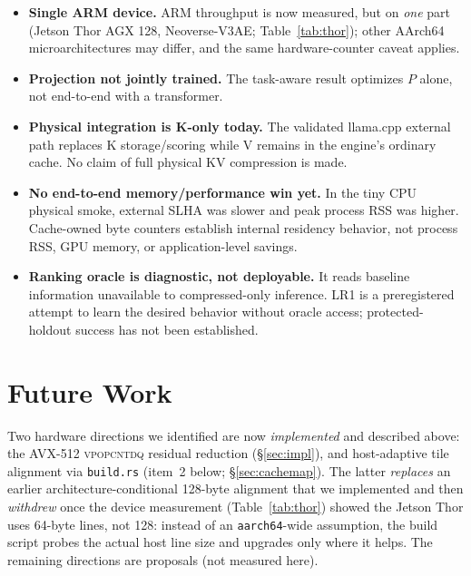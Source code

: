 \documentclass[11pt]{article}
\newcommand{\added}[1]{\textcolor{revisionblue}{#1}}
\theoremstyle{plain}
\theoremstyle{definition}
\begin{document}
\begin{itemize}[leftmargin=1.4em,itemsep=2pt]
    stays analytic for that reason.
  \item \textbf{Single ARM device.} ARM throughput is now measured, but on
    \emph{one} part (Jetson Thor AGX 128, Neoverse-V3AE; Table~\ref{tab:thor});
    other AArch64 microarchitectures may differ, and the same
    hardware-counter caveat applies.
  \item \textbf{Projection not jointly trained.} The task-aware result
    optimizes $P$ alone, not end-to-end with a transformer.
  \item \added{\textbf{Physical integration is K-only today.} The validated
    llama.cpp external path replaces K storage/scoring while V remains in the
    engine's ordinary cache. No claim of full physical KV compression is made.}
  \item \added{\textbf{No end-to-end memory/performance win yet.} In the tiny
    CPU physical smoke, external SLHA was slower and peak process RSS was
    higher. Cache-owned byte counters establish internal residency behavior,
    not process RSS, GPU memory, or application-level savings.}
  \item \added{\textbf{Ranking oracle is diagnostic, not deployable.} It reads
    baseline information unavailable to compressed-only inference. LR1 is a
    preregistered attempt to learn the desired behavior without oracle access;
    protected-holdout success has not been established.}
\end{itemize}

\section{Future Work}
\label{sec:future}
Two hardware directions we identified are now \emph{implemented} and described
above: the AVX-512 \textsc{vpopcntdq} residual reduction (\S\ref{sec:impl}),
and host-adaptive tile alignment via \texttt{build.rs} (item~2 below;
\S\ref{sec:cachemap}). The latter \emph{replaces} an earlier
architecture-conditional 128-byte alignment that we implemented and then
\emph{withdrew} once the device measurement (Table~\ref{tab:thor}) showed the
Jetson Thor uses 64-byte lines, not 128: instead of an \texttt{aarch64}-wide
assumption, the build script probes the actual host line size and upgrades only
where it helps. The remaining directions are proposals (not measured here).
\end{document}

